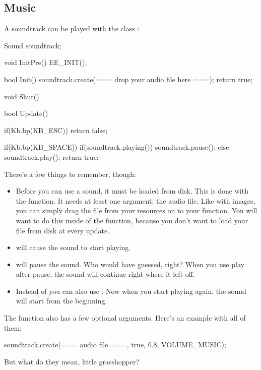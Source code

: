 \subsection{Music}
A soundtrack can be played with the class :

\begin{code}
Sound soundtrack;

void InitPre()
{
   EE_INIT();
}

bool Init()
{
   soundtrack.create(=== drop your audio file here ===);
   return true;
}

void Shut() {}

bool Update()
{
   if(Kb.bp(KB_ESC)) return false;
   
   if(Kb.bp(KB_SPACE))
   {
      if(soundtrack.playing())
      {
         soundtrack.pause();
      } else
      {
         soundtrack.play();
      }
   }
   return true;
}
\end{code}

There's a few things to remember, though:

\begin{itemize}
\item Before you can use a sound, it must be loaded from disk. This is done with the  function. It needs at least one argument: the audio file. Like with images, you can simply drag the file from your resources on to your function. You will want to do this inside of the  function, because you don't want to load your file from disk at every update.
\item {} will cause the sound to start playing.
\item {} will pause the sound. Who would have guessed, right? When you use play after pause, the sound will continue right where it left off. 
\item Instead of  you can also use . Now when you start playing again, the sound will start from the beginning.
\end{itemize}

The  function also has a few optional arguments. Here's an example with all of them:

\begin{code}
soundtrack.create(=== audio file ===, true, 0.8, VOLUME_MUSIC);
\end{code}

But what do they mean, little grasshopper?

